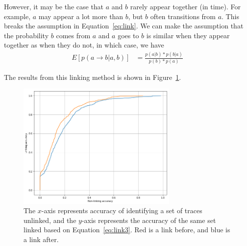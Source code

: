 However, it may be the case that $a$ and $b$ rarely appear together (in time). For example, $a$ may appear a lot more than $b$, but $b$ often transitions from $a$. This breaks the assumption in Equation~\ref{eq:link}. We can make the assumption that the probability $b$ comes from $a$ and $a$ goes to $b$ is similar when they appear together as when they do not, in which case, we have 
\begin{align}
\label{eq:link3}
	E[p(a\rightarrow b|a,b)] &= \frac{p(a|b)*p(b|a)}{p(b)*p(a)}
\end{align}

The results from this linking method is shown in Figure~\ref{fig:linkcdf}.
\begin{figure}\begin{center}
		\includegraphics[width=0.7\textwidth]{graphics/linking2}
		\caption{The $x$-axis represents accuracy of identifying a set of traces unlinked, and the $y$-axis represents the accuracy of the same set linked based on Equation~\ref{eq:link3}. Red is a link before, and blue is a link after.
		\label{fig:linkcdf}}
\end{center}\end{figure}


